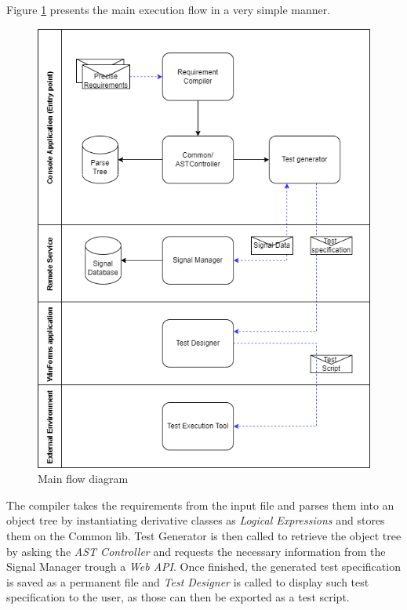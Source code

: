 Figure \ref{fig:data_flow} presents the main execution flow in a very simple manner. \\
\begin{figure}[H]
    \centering
    \includegraphics[scale=0.625]{images/sesnando_dataflow.png}
    \caption{Main flow diagram}
    \label{fig:data_flow}
\end{figure}

The compiler takes the requirements from the input file and parses them into an object tree by instantiating derivative classes as \textit{Logical Expressions} and stores them on the Common lib. Test Generator is then called to retrieve the object tree by asking the \textit{AST Controller} and requests the necessary information from the Signal Manager trough a \textit{Web API}. Once finished, the generated test specification is saved as a permanent file and \textit{Test Designer} is called to display such test specification to the user, as those can then be exported as a test script.
